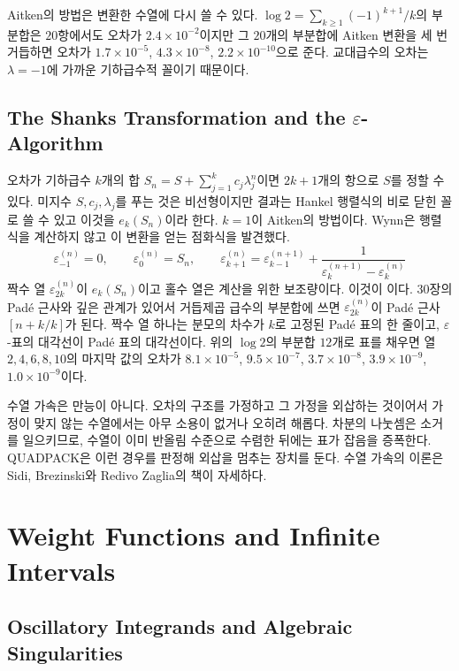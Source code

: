 Aitken의 방법은 변환한 수열에 다시 쓸 수 있다. $\log2=\sum_{k\ge1}(-1)^{k+1}/k$의 부분합은 $20$항에서도 오차가 $2.4\times10^{-2}$이지만 그 $20$개의 부분합에 Aitken 변환을 세 번 거듭하면 오차가 $1.7\times10^{-5}$, $4.3\times10^{-8}$, $2.2\times10^{-10}$으로 준다. 교대급수의 오차는 $\lambda=-1$에 가까운 기하급수적 꼴이기 때문이다.

\subsection{The Shanks Transformation and the $\varepsilon$-Algorithm}

오차가 기하급수 $k$개의 합 $S_n=S+\sum_{j=1}^kc_j\lambda_j^n$이면 $2k+1$개의 항으로 $S$를 정할 수 있다. 미지수 $S,c_j,\lambda_j$를 푸는 것은 비선형이지만 결과는 Hankel 행렬식의 비로 닫힌 꼴로 쓸 수 있고 이것을  $e_k(S_n)$이라 한다\cite{shanks1955}. $k=1$이 Aitken의 방법이다. Wynn은 행렬식을 계산하지 않고 이 변환을 얻는 점화식을 발견했다\cite{wynn1956}.
\[
\varepsilon_{-1}^{(n)}=0,\qquad\varepsilon_0^{(n)}=S_n,\qquad\varepsilon_{k+1}^{(n)}=\varepsilon_{k-1}^{(n+1)}+\frac1{\varepsilon_k^{(n+1)}-\varepsilon_k^{(n)}}
\]
짝수 열 $\varepsilon_{2k}^{(n)}$이 $e_k(S_n)$이고 홀수 열은 계산을 위한 보조량이다. 이것이 이다. 30장의 Padé 근사와 깊은 관계가 있어서 거듭제곱 급수의 부분합에 쓰면 $\varepsilon_{2k}^{(n)}$이 Padé 근사 $[n+k/k]$가 된다. 짝수 열 하나는 분모의 차수가 $k$로 고정된 Padé 표의 한 줄이고, $\varepsilon$-표의 대각선이 Padé 표의 대각선이다. 위의 $\log2$의 부분합 $12$개로 표를 채우면 열 $2,4,6,8,10$의 마지막 값의 오차가 $8.1\times10^{-5}$, $9.5\times10^{-7}$, $3.7\times10^{-8}$, $3.9\times10^{-9}$, $1.0\times10^{-9}$이다.

수열 가속은 만능이 아니다. 오차의 구조를 가정하고 그 가정을 외삽하는 것이어서 가정이 맞지 않는 수열에서는 아무 소용이 없거나 오히려 해롭다. 차분의 나눗셈은 소거를 일으키므로, 수열이 이미 반올림 수준으로 수렴한 뒤에는 표가 잡음을 증폭한다. QUADPACK은 이런 경우를 판정해 외삽을 멈추는 장치를 둔다. 수열 가속의 이론은 Sidi\cite{sidi2003}, Brezinski와 Redivo Zaglia\cite{brezinski1991}의 책이 자세하다.

\section{Weight Functions and Infinite Intervals}
\label{sec:weights-infinite}

\subsection{Oscillatory Integrands and Algebraic Singularities}

